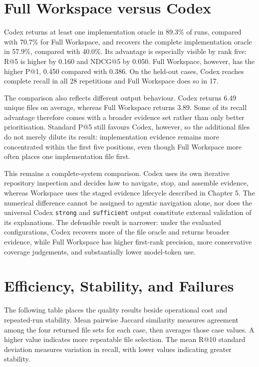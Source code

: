\section{Full Workspace versus Codex}\label{sec:full-workspace-versus-codex}

Codex returns at least one implementation oracle in 89.3\% of runs, compared with 70.7\% for Full Workspace, and recovers the complete implementation oracle in 57.9\%, compared with 40.0\%. Its advantage is especially visible by rank five: R@5 is higher by 0.160 and NDCG@5 by 0.050. Full Workspace, however, has the higher P@1, 0.450 compared with 0.386. On the held-out cases, Codex reaches complete recall in all 28 repetitions and Full Workspace does so in 17.

The comparison also reflects different output behaviour. Codex returns 6.49 unique files on average, whereas Full Workspace returns 3.89. Some of its recall advantage therefore comes with a broader evidence set rather than only better prioritisation. Standard P@5 still favours Codex, however, so the additional files do not merely dilute its result: implementation evidence remains more concentrated within the first five positions, even though Full Workspace more often places one implementation file first.

This remains a complete-system comparison. Codex uses its own iterative repository inspection and decides how to navigate, stop, and assemble evidence, whereas Workspace uses the staged evidence lifecycle described in Chapter 5. The numerical difference cannot be assigned to agentic navigation alone, nor does the universal Codex \texttt{strong} and \texttt{sufficient} output constitute external validation of its explanations. The defensible result is narrower: under the evaluated configurations, Codex recovers more of the file oracle and returns broader evidence, while Full Workspace has higher first-rank precision, more conservative coverage judgements, and substantially lower model-token use.

\section{Efficiency, Stability, and Failures}\label{sec:efficiency-stability-and-failures}

The following table places the quality results beside operational cost and repeated-run stability. Mean pairwise Jaccard similarity measures agreement among the four returned file sets for each case, then averages those case values. A higher value indicates more repeatable file selection. The mean R@10 standard deviation measures variation in recall, with lower values indicating greater stability.

